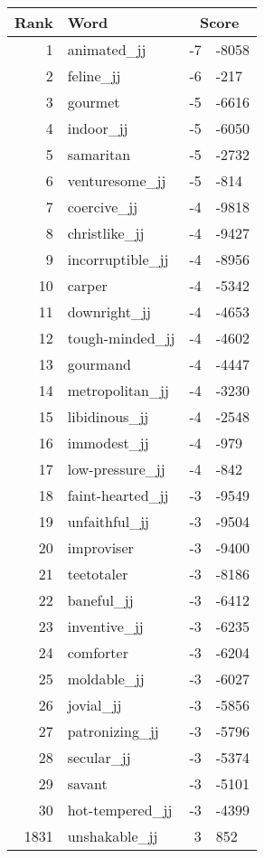 \begin{longtable}[!htbp]{| rlr@{.}l |}
    \hline
    \textbf{Rank} & \textbf{Word} & \multicolumn{2}{c|}{\textbf{Score}} \\
    \hline
    \endhead
    1 & animated\_jj & -7 & -8058 \\
    2 & feline\_jj & -6 & -217 \\
    3 & gourmet & -5 & -6616 \\
    4 & indoor\_jj & -5 & -6050 \\
    5 & samaritan & -5 & -2732 \\
    6 & venturesome\_jj & -5 & -814 \\
    7 & coercive\_jj & -4 & -9818 \\
    8 & christlike\_jj & -4 & -9427 \\
    9 & incorruptible\_jj & -4 & -8956 \\
    10 & carper & -4 & -5342 \\
    11 & downright\_jj & -4 & -4653 \\
    12 & tough-minded\_jj & -4 & -4602 \\
    13 & gourmand & -4 & -4447 \\
    14 & metropolitan\_jj & -4 & -3230 \\
    15 & libidinous\_jj & -4 & -2548 \\
    16 & immodest\_jj & -4 & -979 \\
    17 & low-pressure\_jj & -4 & -842 \\
    18 & faint-hearted\_jj & -3 & -9549 \\
    19 & unfaithful\_jj & -3 & -9504 \\
    20 & improviser & -3 & -9400 \\
    21 & teetotaler & -3 & -8186 \\
    22 & baneful\_jj & -3 & -6412 \\
    23 & inventive\_jj & -3 & -6235 \\
    24 & comforter & -3 & -6204 \\
    25 & moldable\_jj & -3 & -6027 \\
    26 & jovial\_jj & -3 & -5856 \\
    27 & patronizing\_jj & -3 & -5796 \\
    28 & secular\_jj & -3 & -5374 \\
    29 & savant & -3 & -5101 \\
    30 & hot-tempered\_jj & -3 & -4399 \\
    1831 & unshakable\_jj & 3 & 852 \\

\end{longtable}
